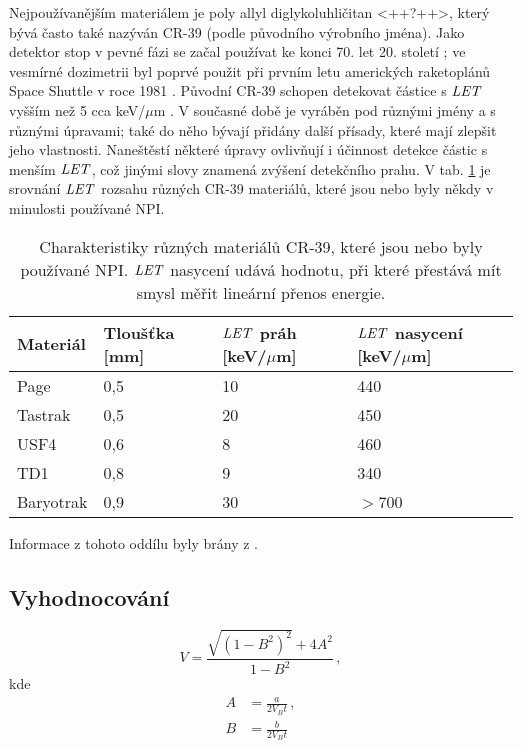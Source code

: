 Nejpoužívanějším materiálem je poly allyl diglykoluhličitan <++?++>, který bývá často také nazýván CR-39 (podle původního výrobního jména). Jako detektor stop v pevné fázi se začal používat ke konci 70. let 20. století \cite{thesisKPBrabcova}; ve vesmírné dozimetrii byl poprvé použit při prvním letu amerických raketoplánů Space Shuttle v roce 1981 \cite{benton}. Původní CR-39 schopen detekovat částice s $\mathit{LET}$ vyšším než 5 cca keV/$\mu$m \cite{benton}. V současné době je vyráběn pod různými jmény a s různými úpravami; také do něho bývají přidány další přísady, které mají zlepšit jeho vlastnosti. Naneštěstí některé úpravy ovlivňují i účinnost detekce částic s menším $\mathit{LET}$, což jinými slovy znamená zvýšení detekčního prahu. V tab. \ref{tab:detektory_PADC_types} je srovnání
$\mathit{LET}$ rozsahu různých CR-39 materiálů, které jsou nebo byly někdy v minulosti používané NPI.
\begin{table}[ht]
  \centering
  \begin{tabular}{llll}
	\toprule
	Materiál&Tloušťka [mm]&$\mathit{LET}$ práh [keV/$\mu$m]&$\mathit{LET}$ nasycení [keV/$\mu$m]\\
	\midrule
	Page&0,5&10&440\\
	Tastrak&0,5&20&450\\
	USF4&0,6&8&460\\
	TD1&0,8&9&340\\
	Baryotrak&0,9&30&$>$700\\
	\bottomrule
  \end{tabular}
  \caption{Charakteristiky různých materiálů CR-39, které jsou nebo byly používané NPI. $\mathit{LET}$ nasycení udává hodnotu, při které přestává mít smysl měřit lineární přenos energie. \cite{thesisKPBrabcova}}
  \label{tab:detektory_PADC_types}
\end{table}

Informace z tohoto oddílu byly brány z \cite{thesisKPBrabcova}.
\subsection{Vyhodnocování}
\cite{ssntd}
\begin{equation}
  V=\frac{\sqrt{\left( 1-B^2 \right)^2}+4A^2}{1-B^2}\,,
  \label{eq:pomerLepRychlosti}
\end{equation}
kde
\begin{align*}
  A&=\frac{a}{2V_Bt}\,,\\
  B&=\frac{b}{2V_Bt}
\end{align*}


